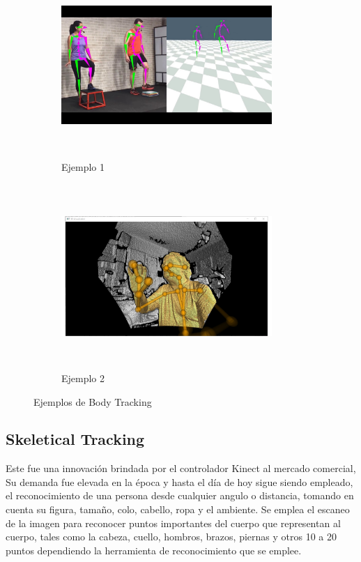 \begin{figure}
	\centering
	\begin{subfigure}{.5\textwidth}
		\centering
		\includegraphics[width=8cm,height=7cm,]{./Images/examplebodytracking.jpg}
		\caption{Ejemplo 1}
		\label{bodyexa1}
	\end{subfigure}%
	\begin{subfigure}{0.5\textwidth}
		\centering
		\includegraphics[width=8cm,height=7cm,]{./Images/examplekinect.jpg}
		\caption{Ejemplo 2}
		\label{bodyexa2}
	\end{subfigure}
	\caption{Ejemplos de Body Tracking}
	\label{bodyexafigure}
\end{figure}
\subsection{Skeletical Tracking}

Este fue una innovación brindada por el controlador Kinect al mercado comercial, Su demanda fue elevada en la época y hasta el día de hoy sigue siendo empleado, el reconocimiento de una persona desde cualquier angulo o distancia, tomando en cuenta su figura, tamaño, colo, cabello, ropa y el ambiente. Se emplea el escaneo de la imagen para reconocer puntos importantes del cuerpo que representan al cuerpo, tales como la cabeza, cuello, hombros, brazos, piernas y otros 10 a 20 puntos dependiendo la herramienta de reconocimiento que se emplee.


